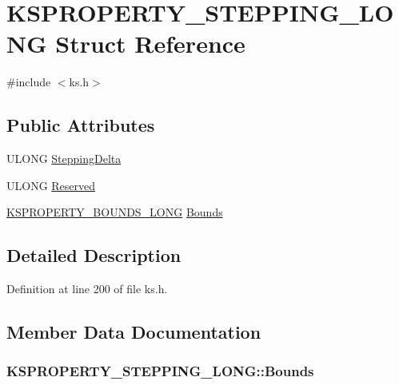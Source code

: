 \hypertarget{struct_k_s_p_r_o_p_e_r_t_y___s_t_e_p_p_i_n_g___l_o_n_g}{}\section{K\+S\+P\+R\+O\+P\+E\+R\+T\+Y\+\_\+\+S\+T\+E\+P\+P\+I\+N\+G\+\_\+\+L\+O\+NG Struct Reference}
\label{struct_k_s_p_r_o_p_e_r_t_y___s_t_e_p_p_i_n_g___l_o_n_g}


{\ttfamily \#include $<$ks.\+h$>$}

\subsection*{Public Attributes}
\begin{DoxyCompactItemize}
\item 
U\+L\+O\+NG \hyperlink{struct_k_s_p_r_o_p_e_r_t_y___s_t_e_p_p_i_n_g___l_o_n_g_a366f54fbf259106218876708bbb472b1}{Stepping\+Delta}
\item 
U\+L\+O\+NG \hyperlink{struct_k_s_p_r_o_p_e_r_t_y___s_t_e_p_p_i_n_g___l_o_n_g_abbcdbc86157c65a57dcdbb454d2ae7e0}{Reserved}
\item 
\hyperlink{union_k_s_p_r_o_p_e_r_t_y___b_o_u_n_d_s___l_o_n_g}{K\+S\+P\+R\+O\+P\+E\+R\+T\+Y\+\_\+\+B\+O\+U\+N\+D\+S\+\_\+\+L\+O\+NG} \hyperlink{struct_k_s_p_r_o_p_e_r_t_y___s_t_e_p_p_i_n_g___l_o_n_g_a265f259b6b07f9a798d2a21524468d18}{Bounds}
\end{DoxyCompactItemize}


\subsection{Detailed Description}


Definition at line 200 of file ks.\+h.



\subsection{Member Data Documentation}
\subsubsection[{\texorpdfstring{Bounds}{Bounds}}]{ K\+S\+P\+R\+O\+P\+E\+R\+T\+Y\+\_\+\+S\+T\+E\+P\+P\+I\+N\+G\+\_\+\+L\+O\+N\+G\+::\+Bounds}\hypertarget{struct_k_s_p_r_o_p_e_r_t_y___s_t_e_p_p_i_n_g___l_o_n_g_a265f259b6b07f9a798d2a21524468d18}{}\label{struct_k_s_p_r_o_p_e_r_t_y___s_t_e_p_p_i_n_g___l_o_n_g_a265f259b6b07f9a798d2a21524468d18}


